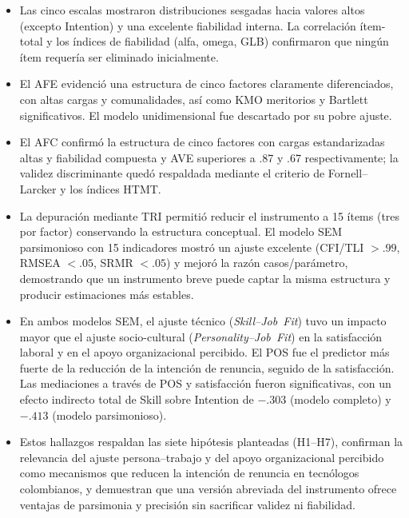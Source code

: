 \begin{itemize}
\item Las cinco escalas mostraron distribuciones sesgadas hacia valores altos (excepto Intention) y una excelente fiabilidad interna. La correlación ítem-total y los índices de fiabilidad (alfa, omega, GLB) confirmaron que ningún ítem requería ser eliminado inicialmente.
\item El AFE evidenció una estructura de cinco factores claramente diferenciados, con altas cargas y comunalidades, así como KMO meritorios y Bartlett significativos. El modelo unidimensional fue descartado por su pobre ajuste.
\item El AFC confirmó la estructura de cinco factores con cargas estandarizadas altas y fiabilidad compuesta y AVE superiores a .87 y .67 respectivamente; la validez discriminante quedó respaldada mediante el criterio de Fornell–Larcker y los índices HTMT.
\item La depuración mediante TRI permitió reducir el instrumento a 15 ítems (tres por factor) conservando la estructura conceptual. El modelo SEM parsimonioso con 15 indicadores mostró un ajuste excelente (CFI/TLI $> .99$, RMSEA $< .05$, SRMR $< .05$) y mejoró la razón casos/parámetro, demostrando que un instrumento breve puede captar la misma estructura y producir estimaciones más estables.
\item En ambos modelos SEM, el ajuste técnico (\emph{Skill--Job Fit}) tuvo un impacto mayor que el ajuste socio-cultural (\emph{Personality--Job Fit}) en la satisfacción laboral y en el apoyo organizacional percibido. El POS fue el predictor más fuerte de la reducción de la intención de renuncia, seguido de la satisfacción. Las mediaciones a través de POS y satisfacción fueron significativas, con un efecto indirecto total de Skill sobre Intention de \(-.303\) (modelo completo) y \(-.413\) (modelo parsimonioso).
\item Estos hallazgos respaldan las siete hipótesis planteadas (H1–H7), confirman la relevancia del ajuste persona–trabajo y del apoyo organizacional percibido como mecanismos que reducen la intención de renuncia en tecnólogos colombianos, y demuestran que una versión abreviada del instrumento ofrece ventajas de parsimonia y precisión sin sacrificar validez ni fiabilidad.
\end{itemize}


